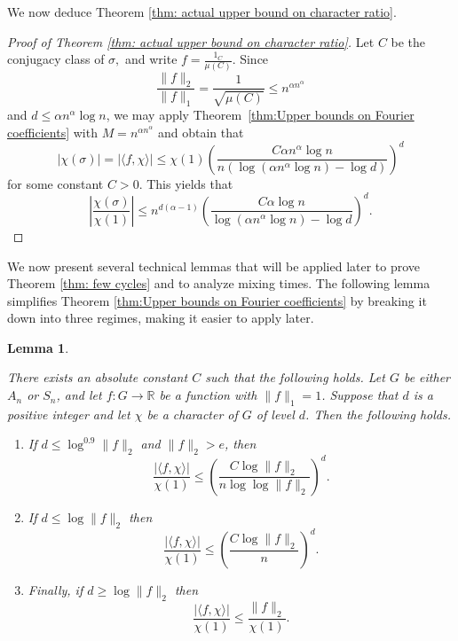 \documentclass[11pt, letterpaper]{amsart}
\newtheorem{lem}[thm]{Lemma}
\newcommand{\remove}[1]{}
\renewcommand\ge{\geqslant}
\renewcommand\le{\leqslant}
\begin{document}
We now deduce Theorem \ref{thm: actual upper bound on character ratio}.
\begin{proof}[Proof of Theorem \ref{thm: actual upper bound on character ratio}] Let $C$ be the conjugacy class of $\sigma,$ and write $f=\frac{1_C}{\mu(C)}$. Since \[\frac{\|f\|_2}{\|f\|_1} = \frac{1}{\sqrt{\mu(C)}} \le n^{\alpha n^{\alpha}}\] and $d \le \alpha n^{\alpha} \log n$, we may apply Theorem~\ref{thm:Upper bounds on Fourier coefficients} with $M=n^{\alpha n^{\alpha}}$ and obtain that
\[
    |\chi(\sigma)| = |\langle f, \chi \rangle| \le \chi(1) \left(\frac{C \alpha n^{\alpha} \log n}{n\left(\log (\alpha n^{\alpha} \log n)-\log d\right)} \right)^d
\]
for some constant $C>0$. This yields that 
\[
\left| \frac{\chi(\sigma)}{\chi(1)}\right|\le  n^{d(\alpha -1)}\left(\frac{C \alpha \log n}{\log (\alpha n^{\alpha} \log n)-\log d}\right)^{d}.
\]
\end{proof}
We now present several technical lemmas that will be applied later to prove Theorem \ref{thm: few cycles} and to analyze mixing times.
The following lemma simplifies Theorem \ref{thm:Upper bounds on Fourier coefficients} by breaking it down into three regimes, making it easier to apply later.
\begin{lem}\label{cor: Dividing our upper bound into regimes}
    \remove{There exist absolute constants $C,c$, such that the following holds. Let $f\colon S_n \to \mathbb{R}$ be a function normalized such that $\|f\|_1=1$ and $\|f\|_2\le e^{cn}$. Let $d$ be a natural number and let $\chi$ be a character of level $d$.}
    There exists an absolute constant $C$ such that the following holds. Let $G$ be either $A_n$ or $S_n$, and let $f\colon G \to \mathbb{R}$ be a function with $\|f\|_1=1$. Suppose that $d$ is a positive integer and let $\chi$ be a character of $G$ of level $d$.
    Then the following holds.
    \begin{enumerate}
        \item If $d\le \log^{0.9}\|f\|_2$ and $\|f\|_2>e$, then
        \[
        \frac{|\langle f, \chi \rangle|}{\chi(1)} \le \left(\frac{C\log\|f\|_2}{n\log\log\|f\|_2}\right)^d. 
        \]
        \item If $d \le \log \|f\|_2$ then 
        \[
        \frac{|\langle f, \chi \rangle|}{\chi(1)} \le \left(\frac{C\log\|f\|_2}{n}\right)^d.
        \]
        \item Finally, if $d \ge \log \|f\|_2$ then
        \[
        \frac{|\langle f, \chi \rangle|}{\chi(1)}\le \frac{\|f\|_2}{\chi(1)}.
        \]
    \end{enumerate}
    \remove{Then in the regime where $d\le \log^{0.9}\|f\|_2$  we have 
    \[
    \frac{|\langle f, \chi \rangle|}{\chi(1)} \le \left(\frac{C\log\|f\|_2}{n\log\log\|f\|_2}\right)^d. 
    \]
    In the regime where $\log^{0.9}\|f\|_2 < d \le \frac{\log \|f\|_2}{4}$ we have 
    \[ \frac{|\langle f, \chi \rangle|}{\chi(1)} \le \left(\frac{C\log\|f\|_2}{n}\right)^d \]
    Finally, in the regime where $d>\frac{1}{4}\log\|f\|_2$ we have 
    \[ \frac{|\langle f, \chi \rangle|}{\chi(1)}\le \frac{\|f\|_2}{\chi(1)}.\]}
\end{lem}
\end{document}
